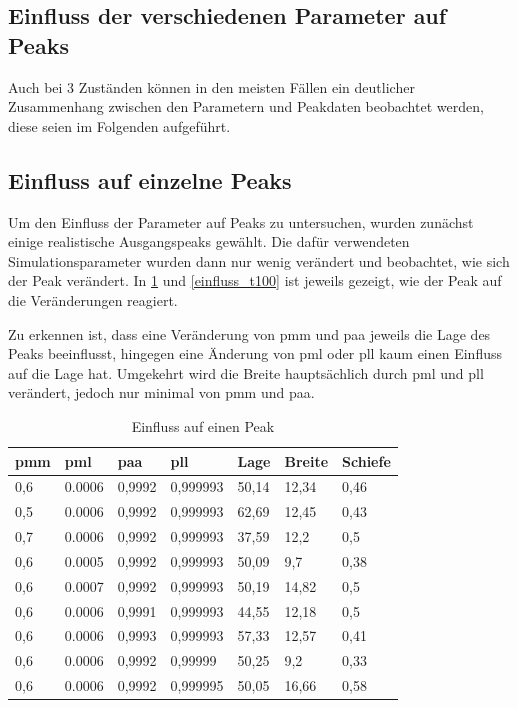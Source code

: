 \subsection{Einfluss der verschiedenen Parameter auf Peaks}
Auch bei 3 Zuständen können in den meisten Fällen ein deutlicher Zusammenhang zwischen den Parametern und Peakdaten beobachtet werden, diese seien im Folgenden aufgeführt.

\subsection{Einfluss auf einzelne Peaks}

Um den Einfluss der Parameter auf Peaks zu untersuchen, wurden zunächst einige realistische Ausgangspeaks gewählt. Die dafür verwendeten Simulationsparameter wurden dann nur wenig verändert und beobachtet, wie sich der Peak verändert. In \ref{einfluss_t50} und \ref{einfluss_t100} ist jeweils gezeigt, wie der Peak auf die Veränderungen reagiert. 

Zu erkennen ist, dass eine Veränderung von pmm und paa jeweils die Lage des Peaks beeinflusst, hingegen eine Änderung von pml oder pll kaum einen Einfluss auf die Lage hat. Umgekehrt wird die Breite hauptsächlich durch pml und pll verändert, jedoch nur minimal von pmm und paa. 


\begin{table}[]
\centering
\caption{Einfluss auf einen Peak}
\label{einfluss_t50}
\begin{tabular}{|l|l|l|l||l|l|l|}
\hline
pmm & pml    & paa    & pll      & Lage  & Breite & Schiefe \\ \hline \hline
0,6 & 0.0006 & 0,9992 & 0,999993 & 50,14 & 12,34  & 0,46    \\ \hline \hline
\cellcolor{yellow} 0,5 & 0.0006 & 0,9992 & 0,999993 & 62,69 & 12,45  & 0,43    \\ \hline
\cellcolor{yellow} 0,7 & 0.0006 & 0,9992 & 0,999993 & 37,59 & 12,2   & 0,5     \\ \hline
0,6 & \cellcolor{yellow} 0.0005 & 0,9992 & 0,999993 & 50,09 & 9,7    & 0,38    \\ \hline
0,6 & \cellcolor{yellow} 0.0007 & 0,9992 & 0,999993 & 50,19 & 14,82  & 0,5     \\ \hline
0,6 & 0.0006 & \cellcolor{yellow} 0,9991 & 0,999993 & 44,55 & 12,18  & 0,5     \\ \hline
0,6 & 0.0006 & \cellcolor{yellow} 0,9993 & 0,999993 & 57,33 & 12,57  & 0,41    \\ \hline
0,6 & 0.0006 & 0,9992 & \cellcolor{yellow} 0,99999  & 50,25 & 9,2    & 0,33    \\ \hline
0,6 & 0.0006 & 0,9992 & \cellcolor{yellow} 0,999995 & 50,05 & 16,66  & 0,58    \\ \hline
\end{tabular}
\end{table}

